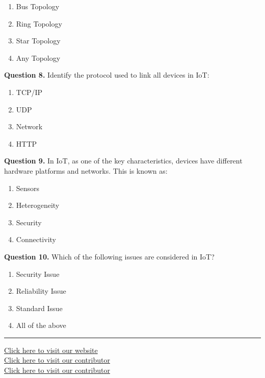 \documentclass[11pt,a4paper]{article}
\begin{document}
\begin{enumerate}[label=(\alph*),itemsep=2pt]
  \item Bus Topology
  \item Ring Topology
  \item Star Topology
  \item Any Topology
\end{enumerate}

\medskip


\noindent   \textbf{Question 8.} Identify the protocol used to link all devices in IoT:

\begin{enumerate}[label=(\alph*),itemsep=2pt]
  \item TCP/IP
  \item UDP
  \item Network
  \item HTTP
\end{enumerate}

\medskip


\noindent   \textbf{Question 9.} In IoT, as one of the key characteristics, devices have different hardware platforms and networks. This is known as:

\begin{enumerate}[label=(\alph*),itemsep=2pt]
  \item Sensors
  \item Heterogeneity
  \item Security
  \item Connectivity
\end{enumerate}

\medskip


\noindent   \textbf{Question 10.} Which of the following issues are considered in IoT?

\begin{enumerate}[label=(\alph*),itemsep=2pt]
  \item Security Issue
  \item Reliability Issue
  \item Standard Issue
  \item All of the above
\end{enumerate}

\vfill
\rule{\linewidth}{0.4pt}

\begin{center}\small
\href{https://bhu-exam.vercel.app/}{Click here to visit our website}\\[4pt]\href{https://me-aryan.vercel.app/}{Click here to visit our contributor}\\[4pt]\href{https://quashan-me.vercel.app/}{Click here to visit our contributor}
\end{center}
\end{document}
